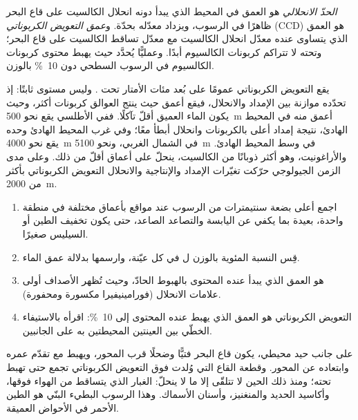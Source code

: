 \begin{definition}\label{def:b1:chemical-biogenic-sediments:ccd}
\emph{الحدّ الانحلالي} هو العمق في المحيط الذي يبدأ دونه انحلال الكالسيت على قاع البحر ظاهرًا في الرسوب، ويزداد معدّله بحدّة. و\emph{عمق التعويض الكربوناتي} (CCD) هو العمق الذي يتساوى عنده معدّل انحلال الكالسيت مع معدّل تساقط الكالسيت على قاع البحر؛ وتحته لا تتراكم كربونات الكالسيوم أبدًا. وعمليًّا يُحدَّد حيث يهبط محتوى كربونات الكالسيوم في الرسوب السطحي دون \qty{10}{\%} بالوزن.
\end{definition}

يقع التعويض الكربوناتي عمومًا على بُعد مئات الأمتار تحت . وليس مستوى ثابتًا: إذ تحدّده موازنة بين الإمداد والانحلال، فيقع أعمق حيث ينتج العوالق كربونات أكثر، وحيث يكون الماء العميق أقلّ تآكلًا. ففي الأطلسي يقع نحو \qty{500}{m} أعمق منه في المحيط الهادئ، نتيجة إمداد أعلى بالكربونات وانحلال أبطأ معًا؛ وفي غرب المحيط الهادئ وحده يقع نحو \qty{4000}{m} في الشمال الغربي، ونحو \qty{5100}{m} في وسط المحيط الهادئ. والأراغونيت، وهو أكثر ذوبانًا من الكالسيت، ينحلّ على أعماق أقلّ من ذلك. وعلى مدى الزمن الجيولوجي حرّكت تغيّرات الإمداد والإنتاجية والانحلال التعويض الكربوناتي بأكثر من \qty{2000}{m}.

\begin{method}\label{met:b1:chemical-biogenic-sediments:ccd}
\begin{enumerate}
  \item اجمع أعلى بضعة سنتيمترات من الرسوب عند مواقع بأعماق مختلفة في منطقة واحدة، بعيدة بما يكفي عن اليابسة والتصاعد الصاعد، حتى يكون تخفيف الطين أو السيليس صغيرًا.
  \item قِس النسبة المئوية بالوزن ل في كل عيّنة، وارسمها بدلالة عمق الماء.
  \item {} هو العمق الذي يبدأ عنده المحتوى بالهبوط الحادّ، وحيث تُظهر الأصداف أولى علامات الانحلال (فورامينيفيرا مكسورة ومحفورة).
  \item التعويض الكربوناتي هو العمق الذي يهبط عنده المحتوى إلى \qty{10}{\%}: اقرأه بالاستيفاء الخطّي بين العينتين المحيطتين به على الجانبين.
\end{enumerate}
\end{method}

على جانب حيد محيطي، يكون قاع البحر فتيًّا وضحلًا قرب المحور، ويهبط مع تقدّم عمره وابتعاده عن المحور. وقطعة القاع التي وُلدت فوق التعويض الكربوناتي تجمع  حتى تهبط تحته؛ ومنذ ذلك الحين لا تتلقّى إلا ما لا ينحلّ: الغبار الذي يتساقط من الهواء فوقها، وأكاسيد الحديد والمنغنيز، وأسنان الأسماك. وهذا الرسوب البطيء البنّي هو الطين الأحمر في الأحواض العميقة.

